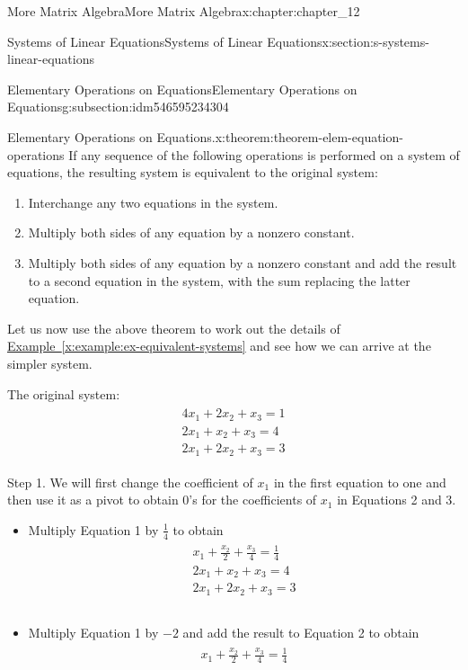 \documentclass[oneside,10pt,]{book}
\newcommand{\xreffont}{\relax}
\numberwithin{equation}{section}
\begin{document}
\begin{chapterptx}{More Matrix Algebra}{}{More Matrix Algebra}{}{}{x:chapter:chapter_12}
\begin{sectionptx}{Systems of Linear Equations}{}{Systems of Linear Equations}{}{}{x:section:s-systems-linear-equations}
\begin{subsectionptx}{Elementary Operations on Equations}{}{Elementary Operations on Equations}{}{}{g:subsection:idm546595234304}
\begin{theorem}{Elementary Operations on Equations.}{}{x:theorem:theorem-elem-equation-operations}
%
If any sequence of the following operations is performed on a system of equations, the resulting system is equivalent to the original system:%
\begin{enumerate}[label=(\alph*)]
\item{}Interchange any two equations in the system.%
\item{}Multiply both sides of any equation by a nonzero constant.%
\item{}Multiply both sides of any equation by a nonzero constant and add the result to a second equation in the system, with the sum replacing the latter equation.%
\end{enumerate}
%
\end{theorem}
Let us now use the above theorem to work out the details of \hyperref[x:example:ex-equivalent-systems]{Example~{\xreffont\ref{x:example:ex-equivalent-systems}}} and see how we can arrive at the simpler system.%
\par
The original system:%
\begin{gather}
\begin{array}{c}
4 x_1+2 x_2+x_3=1 \\ 
2 x_1+x_2+x_3=4 \\
2 x_1+2 x_2+x_3=3
\end{array}\label{g:mrow:idm546595225568}
\end{gather}
%
\par
Step 1. We will first change the coefficient of \(x_1\) in the first equation to one and then use it as a pivot to obtain 0's for the coefficients of \(x_1\) in Equations 2 and 3.%
\begin{itemize}[label=\textbullet]
\item{}Multiply Equation 1 by \(\frac{1}{4}\) to obtain%
\begin{gather}
\begin{array}{c}
x_1+\frac{x_2}{2}+\frac{x_3}{4}=\frac{1}{4}\\
2 x_1+x_2+x_3=4 \\
2 x_1+2 x_2+x_3=3\\\\
\end{array}\label{g:mrow:idm546595222528}
\end{gather}
%
\item{}Multiply Equation 1 by \(-2\) and  add the result to Equation 2 to obtain%
\begin{gather}
\begin{array}{c}
x_1+\frac{x_2}{2}+\frac{x_3}{4}=\frac{1}{4} \\

\end{array}
\end{gather}
\end{itemize}
\end{subsectionptx}
\end{sectionptx}
\end{chapterptx}
\end{document}
